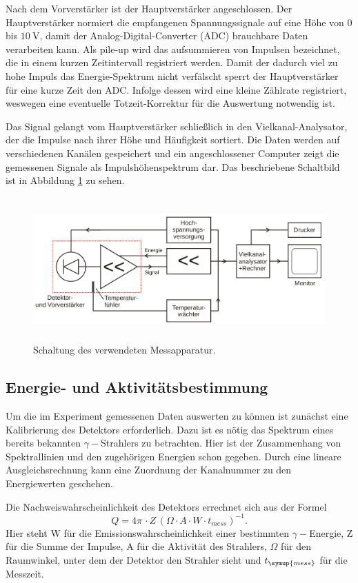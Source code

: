 Nach dem Vorverstärker ist der Hauptverstärker angeschlossen.
Der Hauptverstärker normiert die empfangenen Spannungssignale auf eine Höhe von $0$ bis $\SI{10}{\volt}$, damit der Analog-Digital-Converter (ADC) brauchbare Daten verarbeiten kann.
Als pile-up wird das aufsummieren von Impulsen bezeichnet, die in einem kurzen Zeitintervall registriert werden.
Damit der dadurch viel zu hohe Impuls das Energie-Spektrum nicht verfälscht sperrt der Hauptverstärker für eine kurze Zeit den ADC.
Infolge dessen wird eine kleine Zählrate registriert, weswegen eine eventuelle Totzeit-Korrektur für die Auswertung notwendig ist.

Das Signal gelangt vom Hauptverstärker schließlich in den Vielkanal-Analysator, der die Impulse nach ihrer Höhe und Häufigkeit sortiert.
Die Daten werden auf verschiedenen Kanälen gespeichert und ein angeschlossener Computer zeigt die gemessenen Signale als Impulshöhenspektrum dar.
Das beschriebene Schaltbild ist in Abbildung \ref{fig:Schaltung} zu sehen.
 \begin{figure}
   \centering
   \includegraphics[height=5.5cm]{content/Schaltung.png}
   \caption{Schaltung des verwendeten Messapparatur.\cite{V18}}
   \label{fig:Schaltung}
 \end{figure}
\subsection{Energie- und Aktivitätsbestimmung}
Um die im Experiment gemessenen Daten auswerten zu können ist zunächst eine Kalibrierung des Detektors erforderlich.
Dazu ist es nötig das Spektrum eines bereits bekannten $\gamma-$Strahlers zu betrachten.
Hier ist der Zusammenhang von Spektrallinien und den zugehörigen Energien schon gegeben.
Durch eine lineare Ausgleichsrechnung kann eine Zuordnung der Kanalnummer zu den Energiewerten geschehen.

Die Nachweiswahrscheinlichkeit des Detektors errechnet sich aus der Formel
\begin{equation}
\label{eqn:eff} 
Q = 4\pi\,\cdot Z\,(\Omega\cdot A\cdot W\cdot t_{mess})^{-1}.
\end{equation}
Hier steht W für die Emissionswahrscheinlichkeit einer bestimmten $\gamma-$Energie, Z für die Summe der Impulse, A für die Aktivität des Strahlers, $\Omega$ für den Raumwinkel, unter dem der Detektor den Strahler sieht und $t_{\symup{mess}}$ für die Messzeit.

